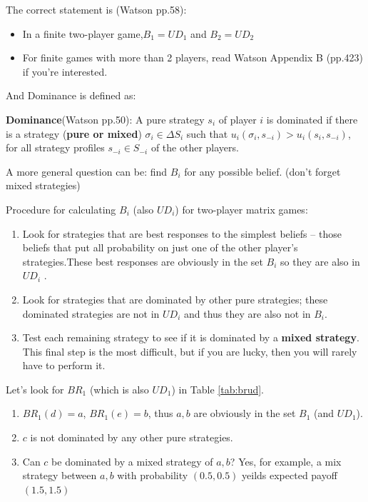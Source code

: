 \documentclass{article}
\begin{document}
\begin{mdframed}[backgroundcolor=blue!20,linecolor=white]
The correct statement is (Watson pp.58):

\begin{itemize}
\item In a finite two-player game,$B_1 = UD_1$ and $B_2 = UD_2$
\item For finite games with more than 2 players, read Watson Appendix B (pp.423) if you're interested.
\end{itemize}

And Dominance is defined as:

\textbf{Dominance}(Watson pp.50): A pure strategy $s_i$ of player $i$ is dominated if there is a strategy (\textbf{pure or mixed}) $\sigma_i \in \Delta S_i$ such that $u_i(\sigma_i , s_{−i}) > u_i (s_i , s_{−i})$, for all strategy profiles $s_{−i} \in S_{−i}$ of the other players.

\medskip

A more general question can be: find $B_i$ for any possible belief.
(don't forget mixed strategies)

\medskip

Procedure for calculating $B_i$ (also $UD_i$) for two-player matrix games:

\begin{enumerate}
\item Look for strategies that are best responses to the simplest beliefs -- those beliefs that put all probability on just one of the other player's strategies.These best responses are obviously in the set $B_i$ so they are also in $UD_i$ .
\item Look for strategies that are dominated by other pure strategies; these dominated strategies are not in $UD_i$ and thus they are also not in $B_i$.
\item Test each remaining strategy to see if it is dominated by a \textbf{mixed strategy}. This final step is the most difficult, but if you are lucky, then you will rarely have to perform it.

\end{enumerate}

Let's look for $BR_1$ (which is also $UD_1$) in Table \ref{tab:brud}.

\begin{enumerate}
\item $BR_1(d)=a$, $BR_1(e)=b$, thus ${a,b}$ are obviously in the set $B_1$ (and $UD_1$).
\item ${c}$ is not dominated by any other pure strategies.
\item Can ${c}$ be dominated by a mixed strategy of $a,b$? Yes, for example, a mix strategy between ${a,b}$ with probability $(0.5,0.5)$ yeilds expected payoff $(1.5,1.5)$
\end{enumerate}


\end{mdframed}
\end{document}
